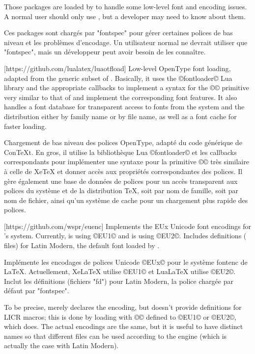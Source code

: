 \documentclass{lltxdoc}
\begin{document}
Those packages are loaded by  to handle some low-level font and
encoding issues. A normal user should only use , but a developer
may need to know about them.


Ces packages sont chargés par "fontspec" pour gérer certaines polices de bas niveau et les problèmes d'encodage. Un utilisateur normal ne devrait utiliser que "fontspec", mais un développeur peut avoir besoin de les connaître.

[https://github.com/lualatex/luaotfload]
Low-level OpenType font loading, adapted from the generic subset of \context.
Basically, it uses the ©fontloader© Lua library and the appropriate callbacks
to implement a syntax for the ©\font© primitive very similar to that of \xetex
and implement the corresponding font features. It also handles a font database
for transparent access to fonts from the system and the \tex distribution
either by family name or by file name, as well as a font cache for faster
loading.

Chargement de bas niveau des polices OpenType, adapté du code générique de ConTeXt. En gros, il utilise la bibliothèque Lua ©fontloader© et les callbacks correspondants pour implémenter une syntaxe pour la primitive ©\font© très similaire à celle de XeTeX et donner accès aux propriétés correspondantes des polices. Il gère également une base de données de polices pour un accès transparent aux polices du système et de la distribution TeX, soit par nom de famille, soit par nom de fichier, ainsi qu'un système de cache pour un chargement plus rapide des polices.

[https://github.com/wspr/euenc]
Implements the EUx Unicode font encodings for \latex's  system.
Currently, \xelatex is using ©EU1© and \lualatex is using ©EU2©. Includes
definitions ( files) for Latin Modern, the default font loaded by
.

Implémente les encodages de polices Unicode ©EUx© pour le système fontenc de LaTeX. Actuellement, XeLaTeX utilise ©EU1© et LuaLaTeX utilise ©EU2©. Inclut les définitions (fichiers "fd") pour Latin Modern, la police chargée par défaut par "fontspec".

To be precise,  merely declares the encoding, but
doesn't provide definitions for LICR macros; this is done by loading
 with ©\UTFencname© defined to ©EU1© or ©EU2©, which
 does. The actual encodings are the same, but it is useful to
have distinct names so that different  files can be used according to
the engine (which is actually the case with Latin Modern).
\end{document}
